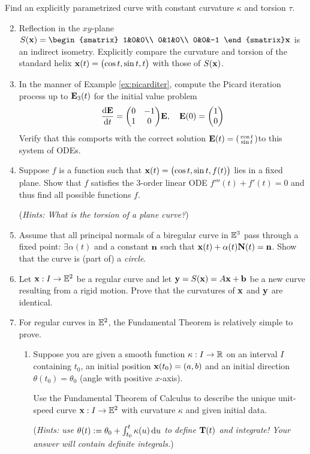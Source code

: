 \begin{exercises}
	\exstart Find an explicitly parametrized curve with constant curvature $\kappa$ and torsion $\tau$.
	
	\begin{enumerate}\setcounter{enumi}{1}
	  \item Reflection in the $xy$-plane $S(\vx)=\smash[t]{
		  \begin{smatrix}
				1&0&0\\
				0&1&0\\
				0&0&-1
			\end{smatrix}
		}\vx$ is an indirect isometry. Explicitly compare the curvature and torsion of the standard helix $\vx(t)=\bigl(\cos t,\sin t,t\bigr)$ with those of $S(\vx)$.
	
	
		\item In the manner of Example \ref{ex:picarditer}, compute the Picard iteration process up to $\vE_3(t)$ for the initial value problem
		\[
			\diff[\vE]{t}=
			\begin{pmatrix}
	  		0&-1\\
	  		1&0
	  	\end{pmatrix}
	  	\!\vE,\quad \vE(0)=\twovec 10
	  \]
	  Verify that this comports with the correct solution $\vE(t)=\stwovec{\cos t}{\sin t}$to this system of ODEs.
	
	  
	  \item Suppose $f$ is a function such that $\vx(t)=\bigl(\cos t,\sin t,f(t)\bigr)$ lies  in a fixed plane. Show that $f$ satisfies the 3\rd-order linear ODE $f'''(t)+f'(t)=0$ and thus find all possible functions $f$.\par
	  (\emph{Hints: What is the torsion of a plane curve?})
	  
	  
		\item Assume that all principal normals of a biregular curve in $\E^3$ pass through a fixed point: $\exists\alpha(t)$ and a constant $\vn$ such that $\vx(t)+\alpha(t)\vN(t)=\vn$. Show that the curve is (part of) a \emph{circle}.
	  
	  
	  \item Let $\vx:I\to \E^2$ be a regular curve and let $\vy=S(\vx)=A\vx+\vb$ be a new curve resulting from a rigid motion. Prove that the curvatures of $\vx$ and $\vy$ are identical.

	   
		\item\label{exs:fundthm2} For regular curves in $\E^2$, the Fundamental Theorem is relatively simple to prove.
		\begin{enumerate}
		  \item Suppose you are given a smooth function $\kappa:I\to\R$ on an interval $I$ containing $t_0$, an initial position $\vx(t_0)=(a,b)$ and an initial direction $\theta(t_0)=\theta_0$ (angle with positive $x$-axis).\par
			Use the Fundamental Theorem of Calculus to describe the unique unit-speed curve $\vx:I\to\E^2$ with curvature $\kappa$ and given initial data.\par
			(\emph{Hints: use $\theta(t):=\theta_0+\int_{t_0}^t\kappa(u)\,\du$ to define $\vT(t)$ and integrate! Your answer will contain definite integrals.})
			

\end{enumerate}
\end{enumerate}
\end{exercises}
